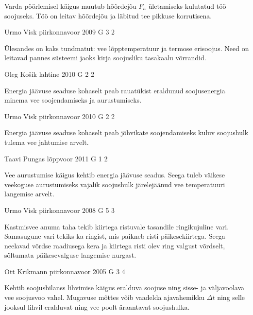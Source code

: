 \documentclass[11pt, twoside]{article}
\begin{document}
{{\ifHint
Varda pöörlemisel käigus muutub hõõrdejõu $F_h$ ületamiseks kulutatud töö soojuseks. Töö on leitav hõõrdejõu ja läbitud tee pikkuse korrutisena.
\fi
}

{Urmo Visk} %
{piirkonnavoor} %
{2009} %
{G 3} %
{2} %
{

\ifHint
Ülesandes on kaks tundmatut: vee lõpptemperatuur ja termose erisoojus. Need on leitavad pannes süsteemi jaoks kirja soojusliku tasakaalu võrrandid.
\fi
}

{Oleg Košik} %
{lahtine} %
{2010} %
{G 2} %
{2} %
{

\ifHint
Energia jäävuse seaduse kohaselt peab rauatükist eraldunud soojusenergia minema vee soojendamiseks ja aurustumiseks.
\fi
}

{Urmo Visk} %
{piirkonnavoor} %
{2010} %
{G 2} %
{2} %
{

\ifHint
Energia jäävuse seaduse kohaselt peab jõhvikate soojendamiseks kuluv soojushulk tulema vee jahtumise arvelt.
\fi
}

{Taavi Pungas} %
{lõppvoor} %
{2011} %
{G 1} %
{2} %
{

\ifHint
Vee aurustumise käigus kehtib energia jäävuse seadus. Seega tuleb väikese veekoguse aurustumiseks vajalik soojushulk järelejäänud vee temperatuuri langemise arvelt.
\fi
}

{Urmo Visk} %
{piirkonnavoor} %
{2008} %
{G 5} %
{3} %
{

\ifHint
Kastmisvee anuma taha tekib kiirtega ristuvale tasandile ringikujuline vari. Samasugune vari tekiks ka ringist, mis paikneb risti päikesekiirtega. Seega neelavad võrdse raadiusega kera ja kiirtega risti olev ring valgust võrdselt, sõltumata päikesevalguse langemise nurgast.
\fi
}

{Ott Krikmann} %
{piirkonnavoor} %
{2005} %
{G 3} %
{4} %
{

\ifHint
Kehtib soojusbilanss lihvimise käigus eralduva soojuse ning sisse- ja väljavoolava vee soojusvoo vahel. Mugavuse mõttes võib vaadelda ajavahemikku $\Delta t$ ning selle jooksul lihvil eralduvat ning vee poolt äraantavat soojushulka.
\fi
}

}
\end{document}
